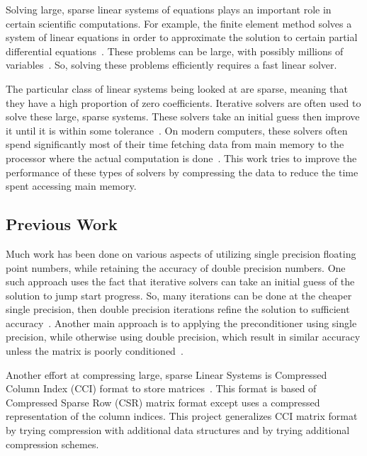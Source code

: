 Solving large, sparse linear systems of equations plays an important role in certain scientific computations.
For example, the finite element method solves a system of linear equations in order to approximate the solution to certain partial differential equations~\cite{Saad:2003:IterativeMethods}.
These problems can be large, with possibly millions of variables~\cite{Davis:2011:FloridaMatrixCollection}.
So, solving these problems efficiently requires a fast linear solver.

The particular class of linear systems being looked at are sparse, meaning that they have a high proportion of zero coefficients.
Iterative solvers are often used to solve these large, sparse systems.
These solvers take an initial guess then improve it until it is within some tolerance~\cite{Saad:2003:IterativeMethods}.
On modern computers, these solvers often spend significantly most of their time fetching data from main memory to the processor where the actual computation is done~\cite{Lawlor:2013:compression}.
This work tries to improve the performance of these types of solvers by compressing the data to reduce the time spent accessing main memory.

\subsection{Previous Work}
Much work has been done on various aspects of utilizing single precision floating point numbers, while retaining the accuracy of double precision numbers.
One such approach uses the fact that iterative solvers can take an initial guess of the solution to jump start progress.
So, many iterations can be done at the cheaper single precision, then double precision iterations refine the solution to sufficient accuracy~\cite{Babolin:2008:coursePass, Buttari:2007:coursePass}.
Another main approach is to applying the preconditioner using single precision, while otherwise using double precision, which result in similar accuracy unless the matrix is poorly conditioned~\cite{Buttari:2008:mixedPrec, Hogg:2010:multiplePasses}.

Another effort at compressing large, sparse Linear Systems is Compressed Column Index (CCI) format to store matrices~\cite{Lawlor:2013:compression}.
This format is based of Compressed Sparse Row (CSR) matrix format except uses a compressed representation of the column indices.
This project generalizes CCI matrix format by trying compression with additional data structures and by trying additional compression schemes.